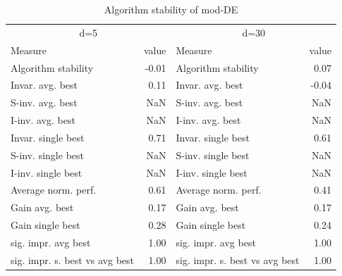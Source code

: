 \begin{table}
\caption{Algorithm stability of mod-DE}
\begin{tabular}{lrlr}
\toprule
\multicolumn{2}{c}{d=5} & \multicolumn{2}{c}{d=30} \\
Measure & value & Measure & value \\
\midrule
Algorithm stability & -0.01 & Algorithm stability & 0.07 \\
Invar. avg. best & 0.11 & Invar. avg. best & -0.04 \\
S-inv. avg. best & NaN & S-inv. avg. best & NaN \\
I-inv. avg. best & NaN & I-inv. avg. best & NaN \\
Invar. single best & 0.71 & Invar. single best & 0.61 \\
S-inv. single best & NaN & S-inv. single best & NaN \\
I-inv. single best & NaN & I-inv. single best & NaN \\
Average norm. perf. & 0.61 & Average norm. perf. & 0.41 \\
Gain avg. best & 0.17 & Gain avg. best & 0.17 \\
Gain single best & 0.28 & Gain single best & 0.24 \\
sig. impr. avg best & 1.00 & sig. impr. avg best & 1.00 \\
sig. impr. s. best vs avg best & 1.00 & sig. impr. s. best vs avg best & 1.00 \\
\bottomrule
\end{tabular}
\end{table}
